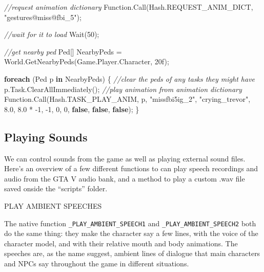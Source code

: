 \documentclass[
  openany]{book}
\newenvironment{Shaded}{\begin{snugshade}}{\end{snugshade}}
\newcommand{\CommentTok}[1]{\textcolor[rgb]{0.56,0.35,0.01}{\textit{#1}}}
\newcommand{\DecValTok}[1]{\textcolor[rgb]{0.00,0.00,0.81}{#1}}
\newcommand{\FloatTok}[1]{\textcolor[rgb]{0.00,0.00,0.81}{#1}}
\newcommand{\FunctionTok}[1]{\textcolor[rgb]{0.00,0.00,0.00}{#1}}
\newcommand{\KeywordTok}[1]{\textcolor[rgb]{0.13,0.29,0.53}{\textbf{#1}}}
\newcommand{\NormalTok}[1]{#1}
\newcommand{\StringTok}[1]{\textcolor[rgb]{0.31,0.60,0.02}{#1}}
\begin{document}
\begin{Shaded}
\begin{Highlighting}[]
\CommentTok{//request animation dictionary}
\NormalTok{Function.}\FunctionTok{Call}\NormalTok{(Hash.}\FunctionTok{REQUEST_ANIM_DICT}\NormalTok{, }\StringTok{"gestures@miss@fbi_5"}\NormalTok{);}

\CommentTok{//wait for it to load}
\FunctionTok{Wait}\NormalTok{(}\DecValTok{50}\NormalTok{);}

\CommentTok{//get nearby ped}
\NormalTok{Ped[] NearbyPeds = World.}\FunctionTok{GetNearbyPeds}\NormalTok{(Game.}\FunctionTok{Player}\NormalTok{.}\FunctionTok{Character}\NormalTok{, 20f);}

\KeywordTok{foreach}\NormalTok{ (Ped p }\KeywordTok{in}\NormalTok{ NearbyPeds)}
\NormalTok{\{   }
    \CommentTok{//clear the peds of any tasks they might have}
\NormalTok{    p.}\FunctionTok{Task}\NormalTok{.}\FunctionTok{ClearAllImmediately}\NormalTok{();}
    \CommentTok{//play animation from animation dictionary}
\NormalTok{    Function.}\FunctionTok{Call}\NormalTok{(Hash.}\FunctionTok{TASK_PLAY_ANIM}\NormalTok{, p, }\StringTok{"missfbi5ig_2"}\NormalTok{, }\StringTok{"crying_trevor"}\NormalTok{, }\FloatTok{8.0}\NormalTok{, }\FloatTok{8.0}\NormalTok{ * }\DecValTok{-1}\NormalTok{, }\DecValTok{-1}\NormalTok{, }\DecValTok{0}\NormalTok{, }\DecValTok{0}\NormalTok{, }\KeywordTok{false}\NormalTok{, }\KeywordTok{false}\NormalTok{, }\KeywordTok{false}\NormalTok{);}
\NormalTok{\}}
\end{Highlighting}
\end{Shaded}

\hypertarget{playing-sounds}{%
\subsection*{Playing Sounds}\label{playing-sounds}}

We can control sounds from the game as well as playing external sound files. Here's an overview of a few different functions to can play speech recordings and audio from the GTA V audio bank, and a method to play a custom .wav file saved onside the ``scripts'' folder.

PLAY AMBIENT SPEECHES

The native function \texttt{\_PLAY\_AMBIENT\_SPEECH1} and \texttt{\_PLAY\_AMBIENT\_SPEECH2} both do the same thing: they make the character say a few lines, with the voice of the character model, and with their relative mouth and body animations. The speeches are, as the name suggest, ambient lines of dialogue that main characters and NPCs say throughout the game in different situations.
\end{document}
